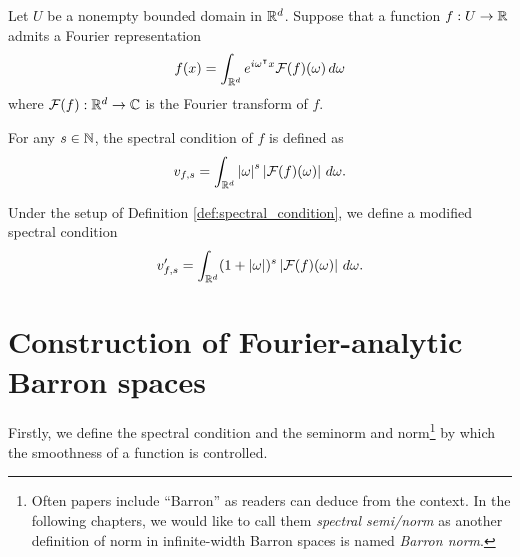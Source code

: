
\begin{definition}
    \label{def:spectral_condition}
    Let $U$ be a nonempty bounded domain in $\mathbb{R}^d$.
    Suppose that a function $f: U \to \mathbb{R}$ admits a Fourier representation
    \begin{equation}
        f(x) = \int_{\mathbb{R}^d} e^{i\omega{}^{\intercal} x} \mathcal{F}(f)(\omega) \,d\omega
    \end{equation}
    where $\mathcal{F}(f): \mathbb{R}^d \to \mathbb{C}$ is the Fourier transform of $f$.

    For any $s \in \mathbb{N}$, the spectral condition of $f$ is defined as
    \begin{equation}
        \label{eq:spectral_condition}
        v_{f,s} 
            = \int_{\mathbb{R}^d} \left| \omega \right|^s \left| \mathcal{F}(f)(\omega) \right|\,d\omega.
    \end{equation}
\end{definition}



\begin{definition}
    \label{def:spectral_condition_mod}
    Under the setup of Definition \ref{def:spectral_condition}, we define a
    modified spectral condition
    \begin{equation}
        \label{eq:spectral_condition_mod}
        v'_{f,s} 
            = \int_{\mathbb{R}^d} (1 + \left| \omega \right|)^s \left| \mathcal{F}(f)(\omega) \right|
            \,d\omega.
    \end{equation}
\end{definition}



\section{Construction of Fourier-analytic Barron spaces}
\label{sec:construction_of_fouier}

Firstly, we define the spectral condition and the seminorm and norm\footnote{
    Often papers include ``Barron'' as readers can deduce from the context. 
    In the following chapters, we would like to call them \textit{spectral 
    semi/norm} as another definition of norm in infinite-width Barron spaces is 
    named \textit{Barron norm}.
} by which the smoothness of a function
is controlled. 

